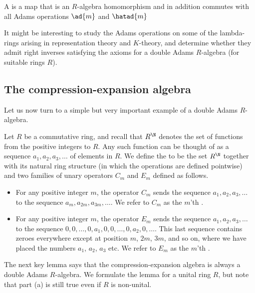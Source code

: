 \documentclass[a4paper]{article}
\begin{document}
\begin{definition}
A  is a map that is an $R$-algebra homomorphism and in addition commutes with all Adams operations $\ad{m}$ and $\hatad{m}$
\end{definition}


It might be interesting to study the Adams operations on some of the lambda-rings arising in representation theory and $K$-theory, and determine whether they admit right inverses satisfying the axioms for a double Adams $R$-algebra (for suitable rings $R$). 

\subsection{The compression-expansion algebra}

Let us now turn to a simple but very important example of a double Adams $R$-algebra.

\begin{definition}
Let $R$ be a commutative ring, and recall that $R^{\N}$ denotes the set of functions from the positive integers to $R$. Any such function can be thought of as a sequence $a_1, a_2, a_3, \ldots$ of elements in $R$. We define the   to be the set $R^{\N}$ together with its natural ring structure (in which the operations are defined pointwise) and two families of unary operators $C_m$ and $E_m$ defined as follows.
\begin{itemize}
\item For any positive integer $m$, the operator $C_m$ sends the sequence $a_1, a_2, a_3, \ldots$ to the sequence $a_{m}, a_{2m}, a_{3m}, \ldots$. We refer to $C_m$ as the $m$'th .
\item For any positive integer $m$, the operator $E_m$ sends the sequence $a_1, a_2, a_3, \ldots$ to the sequence $0, 0, \ldots, 0, a_1, 0, 0, \ldots, 0, a_2, 0, \ldots$. This last sequence contains zeroes everywhere except at position $m$, $2m$, $3m$, and so on, where we have placed the numbers $a_1$, $a_2$, $a_3$ etc. We refer to $E_m$ as the $m$'th .
\end{itemize}
\end{definition}

The next key lemma says that the compression-expansion algebra is always a double Adams $R$-algebra. We formulate the lemma for a unital ring $R$, but note that part (a) is still true even if $R$ is non-unital. 
\end{document}
